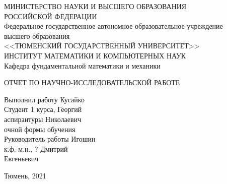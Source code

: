 \begin{titlepage}
    \begin{center}
        МИНИСТЕРСТВО НАУКИ И ВЫСШЕГО ОБРАЗОВАНИЯ\\
        РОССИЙСКОЙ ФЕДЕРАЦИИ\\
        Федеральное государственное автономное образовательное учреждение\\
        высшего образования\\
        <<ТЮМЕНСКИЙ ГОСУДАРСТВЕННЫЙ УНИВЕРСИТЕТ>>\\
        ИНСТИТУТ МАТЕМАТИКИ И КОМПЬЮТЕРНЫХ НАУК\\
        Кафедра фундаментальной математики и механики
    \end{center}

    \vspace{8em}

    \begin{center}
        ОТЧЕТ ПО НАУЧНО-ИССЛЕДОВАТЕЛЬСКОЙ РАБОТЕ
    \end{center}

    \vspace{6em}

    \begin{flushleft}
        Выполнил работу \hfill Кусайко \\
        Студент 1 курса, \hfill Георгий \\
        аспирантуры \hfill Николаевич \\
        очной формы обучения \\
        \vspace{1.5em}
        Руководитель работы \hfill Игошин \\
        к.ф.-м.н., ? \hfill Дмитрий \\
        \hfill Евгеньевич \\
    \end{flushleft}
    
    \vspace{\fill}

    \begin{center}
        Тюмень, 2021
    \end{center}
\end{titlepage}
